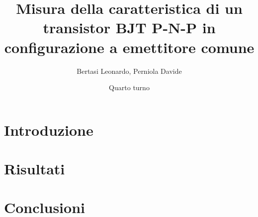 \documentclass{article}
\title{Misura della caratteristica di un transistor BJT P-N-P in configurazione a emettitore comune}
\date{Quarto turno}
\author{Bertasi Leonardo, Perniola Davide }
\begin{document}
\maketitle
\section{Introduzione} 



\section{Risultati}


\section{Conclusioni}
\end{document}
